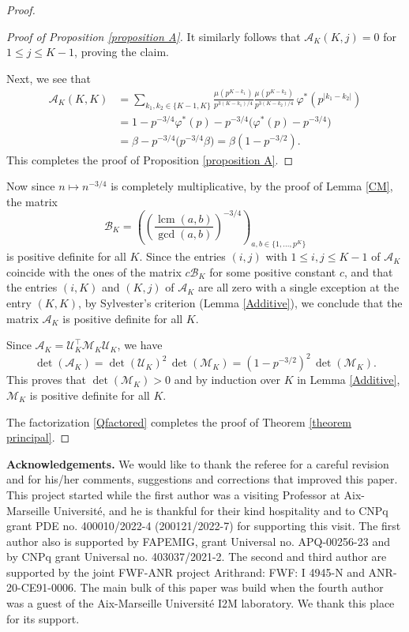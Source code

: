 \documentclass[a4paper,12pt, reqn0]{amsart}
\theoremstyle{remark}
\newcommand{\bt}{\beta}
\newcommand{\U}{\mathcal{U}}
\newcommand{\Mcal}{\mathcal{M}}
\newcommand{\A}{\mathcal{A}}
\DeclareMathOperator{\lcm}{lcm}
\begin{document}
\begin{proof}
\begin{proof}[Proof of Proposition \ref{proposition A}]
It similarly follows that $\A_K(K, j) = 0$ for $1 \leq j \leq K-1$, proving the claim. 

Next, we see that
%
\begin{equation*}
\begin{split}
\A_K(K, K) 
&= \sum\limits_{k_1, k_2 \in \{K-1, K\}} \frac{ \mu(p^{K-k_1})}{p^{3(K-k_1)/4}} \frac{\mu(p^{K-k_2})}{p^{3(K-k_2)/4}} \,\varphi^*(p^{|k_1 - k_2|}) \\
&= 1 - p^{-3/4} \varphi^*(p) -p^{-3/4} \bigl( \varphi^*(p) - p^{-3/4}  \bigr)\\
&= \bt - p^{-3/4} \bigl( p^{-3/4} \bt \bigr) 
= \bt(1 - p^{-3/2}).
\end{split}
\end{equation*}
%
This completes the proof of Proposition \ref{proposition A}. 
\end{proof}

Now since $n \mapsto n^{-3/4}$ is completely multiplicative, by the proof of Lemma \ref{CM}, the matrix 
$$\mathcal{B}_K=\left(\left( \frac{\lcm(a,b)}{\gcd(a,b)}\right)^{-3/4}\right)_{a,b\in\{1,...,p^K\}}$$
is positive definite for all $K$. Since the entries $(i,j)$ with $1\leq i,j\leq K-1$ of $\mathcal{A}_K$ coincide with the ones of the matrix $c\mathcal{B}_K$ for some positive constant $c$, and that the entries $(i,K)$ and $(K,j)$ of $\mathcal{A}_K$ are all zero with a single exception at the entry $(K,K)$, by Sylvester's criterion (Lemma \ref{Additive}), we conclude that the matrix $\mathcal{A}_K$ is positive definite for all $K$.

Since $\mathcal{A}_K= \U_K^{\top} \Mcal_K \U_K$, we have
$$
\det(\A_K) = \det(\U_K)^2 \, \det(\Mcal_K) = (1-p^{-3/2})^2 \, \det(\Mcal_K). 
$$
This proves that $\det(\Mcal_K)>0$ and by induction over $K$ in Lemma \ref{Additive}, $\Mcal_K$ is positive definite for all $K$. 

The factorization \eqref{Qfactored} completes the proof of Theorem \ref{theorem principal}.
\end{proof}
\noindent\textbf{Acknowledgements.} We would like to thank the referee for a careful revision and for his/her comments, suggestions and corrections that improved this paper. This project started while the
first author was a visiting Professor at Aix-Marseille Universit\'e,
and he is thankful for their kind hospitality and to CNPq grant PDE no. 400010/2022-4 (200121/2022-7) for supporting this visit. The first author also is
supported by FAPEMIG, grant Universal no. APQ-00256-23 and by CNPq
grant Universal no. 403037/2021-2. The second and third author are
supported by the joint FWF-ANR project Arithrand: FWF: I 4945-N and
ANR-20-CE91-0006. The main bulk of this paper was build when the
fourth author was a guest of the
Aix-Marseille Universit\'e I2M laboratory. We thank this place for its support.
\end{document}

